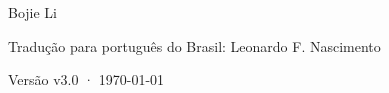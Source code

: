 \begin{titlepage}
\vfill
{\LARGE\sffamily Bojie Li\par}
\vspace{0.3cm}
{\normalsize\sffamily\color{structurecolor!80} Tradução para português do Brasil: Leonardo F. Nascimento\par}
\vspace{0.7cm}
{\small\sffamily\color{structurecolor!80} Versão v3.0 · \today\par}
\vspace{1.2cm}
\end{titlepage}
